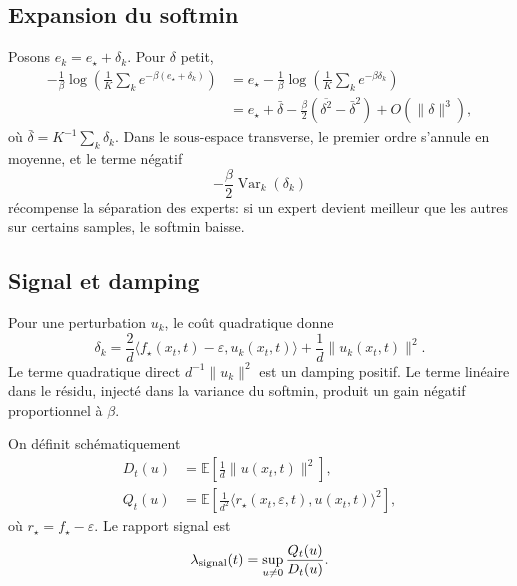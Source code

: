 \documentclass[11pt,a4paper]{article}
\newcommand{\E}{\mathbb{E}}
\newcommand{\Var}{\operatorname{Var}}
\newcommand{\1}{\mathbf{1}}
\newcommand{\eps}{\varepsilon}
\newcommand{\xt}{x_t}
\begin{document}
\subsection{Expansion du softmin}

Posons $e_k=e_\star+\delta_k$. Pour $\delta$ petit,
\begin{align}
-\frac1\beta\log\left(\frac1K\sum_k e^{-\beta(e_\star+\delta_k)}\right)
&=e_\star-\frac1\beta\log\left(\frac1K\sum_k e^{-\beta\delta_k}\right)\\
&=e_\star+\bar\delta-\frac\beta2\left(\overline{\delta^2}-\bar\delta^2\right)+O(\|\delta\|^3),
\label{eq:softmin_expansion}
\end{align}
où $\bar\delta=K^{-1}\sum_k\delta_k$. Dans le sous-espace transverse, le premier ordre s'annule en moyenne, et le terme négatif
\[
-\frac\beta2\Var_k(\delta_k)
\]
récompense la séparation des experts: si un expert devient meilleur que les autres sur certains samples, le softmin baisse.

\subsection{Signal et damping}

Pour une perturbation $u_k$, le coût quadratique donne
\begin{equation}
\delta_k
=\frac2d\langle f_\star(\xt,t)-\eps,u_k(\xt,t)\rangle
+\frac1d\|u_k(\xt,t)\|^2.
\end{equation}
Le terme quadratique direct $d^{-1}\|u_k\|^2$ est un damping positif. Le terme linéaire dans le résidu, injecté dans la variance du softmin, produit un gain négatif proportionnel à $\beta$.

On définit schématiquement
\begin{align}
D_t(u)&=\E\left[\frac1d\|u(\xt,t)\|^2\right],\\
Q_t(u)&=\E\left[\frac1{d^2}\langle r_\star(\xt,\eps,t),u(\xt,t)\rangle^2\right],
\end{align}
où $r_\star=f_\star-\eps$. Le rapport signal est
\begin{equation}
\lambda_{\rm signal}(t)=\sup_{u\ne 0}\frac{Q_t(u)}{D_t(u)}.
\label{eq:lambda_signal}
\end{equation}
\end{document}
